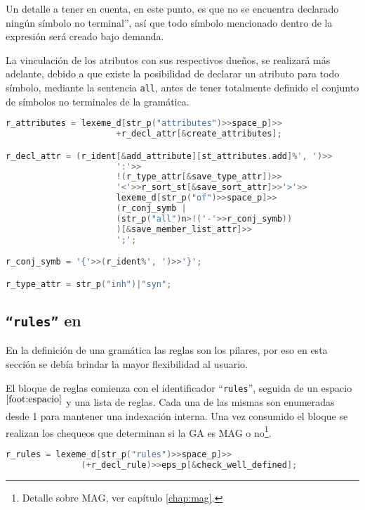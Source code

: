 Un detalle a tener en cuenta, en este punto, es que no se encuentra declarado ningún símbolo no terminal'', así que todo símbolo mencionado dentro de la expresión será creado bajo demanda.

La vinculación de los atributos con sus respectivos dueños, se realizará más adelante, debido a que existe la posibilidad de declarar un atributo para todo símbolo, mediante la sentencia \texttt{all}, antes de tener totalmente definido el conjunto de símbolos no terminales de la gramática.

\begin{lstlisting}[language=C++, basicstyle=\scriptsize, columns=fullflexible, linewidth=11cm]
r_attributes = lexeme_d[str_p("attributes")>>space_p]>>
                      +r_decl_attr[&create_attributes];

r_decl_attr = (r_ident[&add_attribute][st_attributes.add]%', ')>>
                      ':'>>
                      !(r_type_attr[&save_type_attr])>>
                      '<'>>r_sort_st[&save_sort_attr]>>'>'>>
                      lexeme_d[str_p("of")>>space_p]>>
                      (r_conj_symb |
                      (str_p("all")n>!('-'>>r_conj_symb))
                      )[&save_member_list_attr]>>
                      ';';

r_conj_symb = '{'>>(r_ident%', ')>>'}';

r_type_attr = str_p("inh")|"syn";
\end{lstlisting}

\subsection{\texttt{``rules''} en \spirit}

En la definición de una gramática las reglas son los pilares, por eso en esta sección se debía brindar la mayor flexibilidad al usuario.

El bloque de reglas comienza con el identificador ``\texttt{rules}'', seguida de un espacio$^{\ref{foot:espacio}}$ y una lista de reglas. Cada una de las mismas son enumeradas desde 1 para mantener una indexación interna. Una vez consumido el bloque se realizan los chequeos que determinan si la GA es MAG o no\footnote{Detalle sobre MAG, ver capítulo \ref{chap:mag}.}.

\begin{lstlisting}[language=C++, basicstyle=\scriptsize, columns=fullflexible, linewidth=9cm]
r_rules = lexeme_d[str_p("rules")>>space_p]>>
               (+r_decl_rule)>>eps_p[&check_well_defined];
\end{lstlisting}

